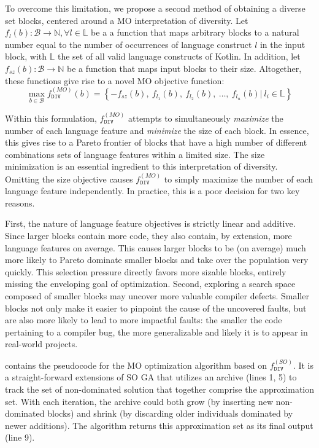 To overcome this limitation, we propose a second method
of obtaining a diverse set blocks, centered around a \Gls{MO}
interpretation of diversity. 
Let $f_l(b) : \mathcal{B} \to \mathbb{N}, \forall l \in \mathbb{L}$ be a
a function that maps arbitrary blocks to a natural number
equal to the number of occurrences of language construct $l$
in the input block, with $\mathbb{L}$ the set of all valid language constructs
of Kotlin.
In addition, let $f_{sz}(b) : \mathcal{B} \to \mathbb{N}$ be a function
that maps input blocks to their size.
Altogether, these functions give rise to a novel \gls{MO} objective function:
\begin{equation}
\max_{b \in \mathcal{B}} f^{(MO)}_{\texttt{DIV}}(b) = \left\lbrace -f_{sz}(b), ~f_{l_1}(b),~f_{l_2}(b),~\dots,~f_{l_n}(b)|~l_i \in \mathbb{L} \right\rbrace
\end{equation}

Within this formulation, $f^{(MO)}_{\texttt{DIV}}$ attempts to simultaneously
\textit{maximize} the number of each language feature
and \textit{minimize} the size of each block.
In essence, this gives rise to a Pareto frontier of blocks
that have a high number of different combinations sets of language features
within a limited size.
The size minimization is an essential ingredient to this interpretation of diversity.
Omitting the size objective causes $f^{(MO)}_{\texttt{DIV}}$
to simply maximize the number of each language feature independently.
In practice, this is a poor decision for two key reasons.

First, the nature of language feature objectives is strictly linear and additive.
Since larger blocks contain more code, they also contain, by extension, more
language features on average.
This causes larger blocks to be (on average) much more likely
to Pareto dominate smaller blocks and take over the population very quickly.
This selection pressure directly favors more sizable blocks, entirely missing
the enveloping goal of optimization.
Second, exploring a search space composed of smaller blocks may uncover
more valuable compiler defects.
Smaller blocks not only make it easier to pinpoint the cause of the
uncovered faults, but are also more likely to lead to
more impactful faults: the smaller the code pertaining to a compiler bug,
the more generalizable and likely it is to appear in real-world projects.

 contains the pseudocode for the \gls{MO} optimization
algorithm based on $f^{(SO)}_{\texttt{DIV}}$.
It is a straight-forward extensions of \gls{SO} \gls{GA} that utilizes
an archive (lines 1, 5) to track the set of non-dominated solution
that together comprise the approximation set.
With each iteration, the archive could both grow (by inserting new non-dominated
blocks) and shrink (by discarding older individuals dominated by newer additions).
The algorithm returns this approximation set as its final output (line 9).

